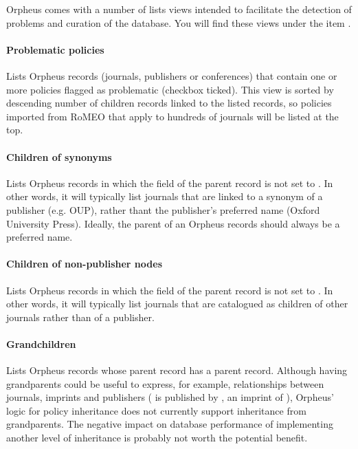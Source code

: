 \documentclass[british, 12pt]{article}
\begin{document}
Orpheus comes with a number of lists views intended to facilitate the detection of problems and curation of the database. You will find these views under the  item .

\paragraph{Problematic policies} Lists Orpheus records (journals, publishers or conferences) that contain one or more policies flagged as problematic (checkbox  ticked). This view is sorted by descending number of children records linked to the listed records, so policies imported from RoMEO that apply to hundreds of journals will be listed at the top.

\paragraph{Children of synonyms} Lists Orpheus records in which the   field of the parent record is not set to . In other words,  it will typically list journals that are linked to a synonym of a publisher (e.g. OUP), rather thant the publisher's preferred name (Oxford University Press). Ideally, the parent of an Orpheus records should always be a preferred name.

\paragraph{Children of non-publisher nodes} Lists Orpheus records in which the   field of the parent record is not set to . In other words,  it will typically list journals that are catalogued as children of other journals rather than of a publisher.

\paragraph{Grandchildren} Lists Orpheus records whose parent record has a parent record. Although having grandparents could be useful to express, for example, relationships between journals, imprints and publishers ( is published by , an imprint of ), Orpheus' logic for policy inheritance does not currently support inheritance from grandparents. The negative impact on database performance of implementing another level of inheritance is probably not worth the potential benefit.
\end{document}
